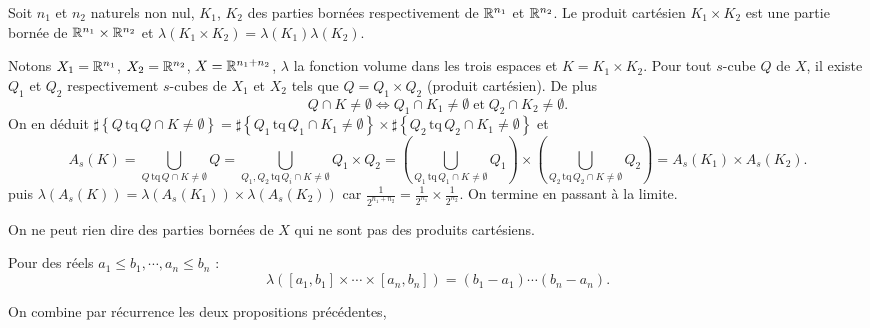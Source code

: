 \begin{propn}
 Soit $n_1$ et $n_2$ naturels non nul, $K_1$, $K_2$ des parties bornées respectivement de $\mathbb{R}^{n_1}$ et $\mathbb{R}^{n_2}$. Le produit cartésien $K_1\times K_2$ est une partie bornée de  $\mathbb{R}^{n_1} \times \mathbb{R}^{n_2}$ et $\lambda(K_1\times K_2)=\lambda(K_1)\lambda( K_2)$.
\end{propn}
\begin{demo}
Notons $X_1=\mathbb{R}^{n_1}$, $X_2=\mathbb{R}^{n_2}$, $X=\mathbb{R}^{n_1 + n_2}$, $\lambda$ la fonction volume dans les trois espaces et $K=K_1 \times K_2$. Pour tout $s$-cube $Q$ de $X$, il existe $Q_1$ et $Q_2$ respectivement $s$-cubes de $X_1$ et $X_2$ tels que $Q=Q_1 \times Q_2$ (produit cartésien). De plus
\begin{displaymath}
 Q \cap K \neq \emptyset \Leftrightarrow Q_1 \cap K_1 \neq \emptyset \; \mathrm{ et } \; Q_2 \cap K_2 \neq \emptyset .
\end{displaymath}
On en déduit
$\sharp \left\lbrace Q \,\mathrm{tq}\, Q \cap K \neq \emptyset \right\rbrace =
\sharp \left\lbrace Q_1 \,\mathrm{tq}\, Q_1 \cap K_1 \neq \emptyset \right\rbrace
\times
\sharp \left\lbrace Q_2 \,\mathrm{tq}\, Q_2 \cap K_1 \neq \emptyset \right\rbrace$
et
\begin{displaymath}
 A_s(K) = \bigcup_{Q \,\mathrm{tq}\, Q \cap K \neq \emptyset} Q = \bigcup_{Q_1, Q_2 \,\mathrm{tq}\, Q_i \cap K \neq \emptyset} Q_1\times Q_2
 = \left( \bigcup_{Q_1 \,\mathrm{tq}\, Q_1 \cap K \neq \emptyset} Q_1\right) \times \left( \bigcup_{Q_2 \,\mathrm{tq}\, Q_2 \cap K \neq \emptyset} Q_2\right)
 = A_s(K_1) \times A_s(K_2).
\end{displaymath}
puis $\lambda(A_s(K)) = \lambda(A_s(K_1))\times \lambda(A_s(K_2))$ car $\frac{1}{2^{n_1+n_2}}=\frac{1}{2^{n_1}}\times \frac{1}{2^{n_2}}$. On termine en passant à la limite.
\end{demo}
On ne peut rien dire des parties bornées de $X$ qui ne sont pas des produits cartésiens.
\begin{propn}
Pour des réels $a_1 \leq b_1, \cdots , a_n \leq b_n$ :
\begin{displaymath}
 \lambda([a_1,b_1]\times \cdots \times [a_n,b_n]) = (b_1-a_1) \cdots (b_n-a_n).
\end{displaymath}
\end{propn}
\begin{demo}
On combine par récurrence les deux propositions précédentes,
\end{demo}

